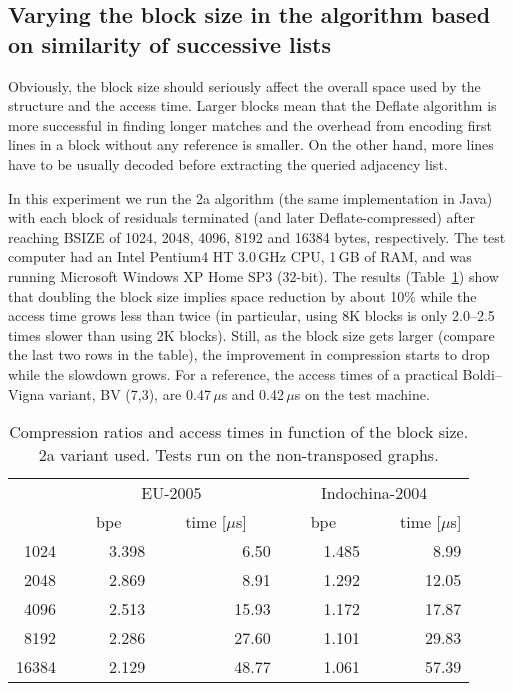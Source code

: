 \documentclass[envcountsame]{llncs}
\begin{document}
\subsection{Varying the block size in the algorithm based on similarity of successive lists}


Obviously, the block size should seriously affect the overall space used by the 
structure and the access time. Larger blocks mean that the Deflate algorithm 
is more successful in finding longer matches and the overhead from encoding 
first lines in a block without any reference is smaller. On the other hand, 
more lines have to be usually decoded before extracting the queried adjacency list.

In this experiment we run the 2a algorithm (the same implementation in Java) with 
each block of residuals terminated (and later Deflate-compressed) after 
reaching BSIZE of 1024, 2048, 4096, 8192 and 16384 bytes, respectively. 
The test computer had an Intel Pentium4 HT 3.0\,GHz CPU, 1\,GB of RAM, 
and was running Microsoft Windows XP Home SP3 (32-bit).
The results (Table~\ref{table:blocks}) show that doubling the block size implies 
space reduction by about 10\% while the access time grows less than twice 
(in particular, using 8K blocks is only 2.0--2.5 times slower than using 2K blocks).
Still, as the block size gets larger (compare the last two rows in the table), 
the improvement in compression starts to drop while the slowdown grows.
For a reference, the access times of a practical Boldi--Vigna variant, BV (7,3), 
are 0.47\,$\mu$s and 0.42\,$\mu$s on the test machine.


\begin{table}
\centering
\begin{tabular}{rrrrr}
\hline
 & \multicolumn{2}{c}{EU-2005} &  \multicolumn{2}{c}{Indochina-2004}  \\
      ~~~&~~~bpe~~~&~~~time [$\mu$s]~~~&~~~bpe~~~&~~~time [$\mu$s] \\ 
\hline
1024 & 3.398 & 6.50 & 1.485 & 8.99 \\
2048 & 2.869 & 8.91 & 1.292 & 12.05 \\
4096 & 2.513 & 15.93 & 1.172 & 17.87 \\
8192 & 2.286 & 27.60 & 1.101 & 29.83 \\
16384 & 2.129 & 48.77 & 1.061 & 57.39 \\
\hline
\end{tabular}
\vspace{4mm}
\caption{Compression ratios and access times in function of the block size. 
2a variant used. Tests run on the non-transposed graphs.}
\label{table:blocks}
\end{table}
\end{document}
